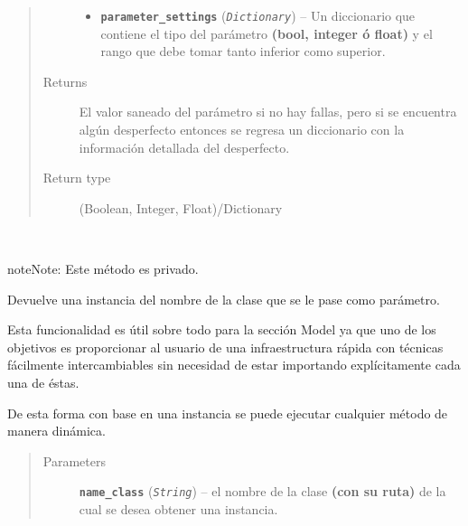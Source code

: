 \documentclass[letterpaper,10pt,english]{sphinxmanual}
\begin{document}
\begin{fulllineitems}
\begin{fulllineitems}
\begin{quote}
\begin{description}
\begin{itemize}
\item {} 
\textbf{\texttt{parameter\_settings}} (\emph{\texttt{Dictionary}}) -- Un diccionario que contiene el tipo del parámetro
\textbf{(bool, integer ó float)} y el rango que debe tomar
tanto inferior como superior.

\end{itemize}

\item[{Returns}] \leavevmode
El valor saneado del parámetro si no hay fallas, pero si se encuentra
algún desperfecto entonces se regresa un diccionario con la información
detallada del desperfecto.

\item[{Return type}] \leavevmode
(Boolean, Integer, Float)/Dictionary

\end{description}\end{quote}

\end{fulllineitems}


\begin{fulllineitems}
\label{Controller/Verifier:Controller.Verifier.Verifier._Verifier__verify_instance}~
\begin{notice}{note}{Note:}
Este método es privado.
\end{notice}

\begin{DUlineblock}{0em}
\item[] Devuelve una instancia del nombre de la clase que se le pase
como parámetro.
\item[] 
\item[] Esta funcionalidad es útil sobre todo para la sección Model ya que
uno de los objetivos es proporcionar al usuario de una infraestructura 
rápida con técnicas fácilmente intercambiables sin necesidad de estar
importando explícitamente cada una de éstas.
\item[] 
\item[] De esta forma con base en una instancia se puede ejecutar cualquier método
de manera dinámica.
\end{DUlineblock}
\begin{quote}\begin{description}
\item[{Parameters}] \leavevmode
\textbf{\texttt{name\_class}} (\emph{\texttt{String}}) -- el nombre de la clase \textbf{(con su ruta)} de la cual se
desea obtener una instancia.


\end{description}
\end{quote}
\end{fulllineitems}
\end{fulllineitems}
\end{document}
